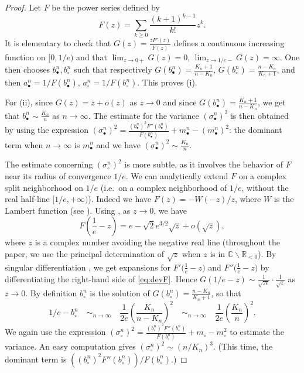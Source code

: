 \documentclass[11pt]{article}
\theoremstyle{definition}
\numberwithin{equation}{section}
\numberwithin{figure}{section}
\numberwithin{table}{section}
\newcommand{\R}{\mathbb{R}}
\newcommand{\CC}{\mathbb{C}}
\def\abn{a_{\bullet}^{n}}
\def\acn{a_{\circ}^{n}}
\def\bbn{b_{\bullet}^{n}}
\def\bcn{b_{\circ}^{n}}
\def\mbn{m_{\bullet}^{n}}
\def\scn{\sigma_{\circ}^{n}}
\def\sbn{\sigma_{\bullet}^{n}}
\begin{document}
\begin{proof}Let $F$ be the power series defined by
\begin{equation}
\label{eq:F}F(z)= \sum_{k \geq 0} \frac{(k+1)^{k-1}}{k!} z^{k}.
\end{equation}
It is elementary to check that $G(z)= \frac{z F'(z)}{F(z)}$ defines a continuous increasing function on $[0,1/e)$ and that $\lim_{z \rightarrow 0+} G(z)=0$, $\lim_{z \rightarrow 1/e-} G(z)=\infty$. One then chooses $\bbn, \bcn$ such that respectively $G(\bbn)=\frac{K_{n}+1}{n-K_{n}}$, $G(\bcn)= \frac{n-K_{n}}{K_{n}+1}$, and then $\abn=1/F(\bbn)$, $\acn=1/F(\bcn)$.
This proves (i).

For (ii), since $G(z)=z+o(z)$ as $z \rightarrow 0$ and since $G(\bbn)= \frac{K_{n}+1}{n-K_{n}}$, we get that $\bbn \sim \frac{K_{n}}{n}$ as $n \rightarrow \infty$.
The estimate for the variance $(\sbn)^{2}$ is then obtained by using the expression
\hbox{$(\sbn)^{2}= \frac{(\bbn)^{2} F''(\bbn)}{F(\bbn)}+\mbn-(\mbn)^{2}$:}
the dominant term when $n  \rightarrow \infty$ is $\mbn$
and we have \hbox{$(\sbn)^{2}\sim \frac{K_{n}}{n}$}.


The estimate concerning $(\scn)^{2}$ is more subtle, as it involves the behavior of $F$ near its radius of convergence $1/e$.
We can analytically extend $F$
on a complex split neighborhood on $1/e$ (i.e.\ on a complex neighborhood of $1/e$, without the real half-line $[1/e,+\infty)$).
Indeed we have $F(z)=-W(-z)/z$, where $W$ is the Lambert function (see \cite[Eq~3.1]{CGHJK96}).
Using \cite[Eq~4.22]{CGHJK96}, as $z \rightarrow 0$, we have
\begin{equation}
\label{eq:devF}F \left( \frac{1}{e}-z \right)=e- \sqrt{2} e^{3/2} \sqrt{z}+ o(\sqrt{z}),
\end{equation}
where $z$ is a complex number avoiding the negative real line
(throughout the paper, we use the principal determination of
$\sqrt{z}$ when $z$ is in $\CC \backslash \R_{<0}$).
By singular differentiation \cite[Theorem VI.8 p. 419]{FS09},
we get expansions for $F' \big( \tfrac{1}{e}-z \big)$ and $F'' \big( \tfrac{1}{e}-z \big)$
by differentiating the right-hand side of \eqref{eq:devF}.
Hence $G(1/e-z) \sim \frac{1}{\sqrt{2e}} \cdot \frac{1}{\sqrt{z}}$ as $z \rightarrow 0$.
By definition $\bcn$ is the solution of $G(\bcn)=\tfrac{n-K_n}{K_n+1}$, so that
\begin{equation}
  1/e-\bcn  \quad \mathop{\sim}_{n \rightarrow \infty} \quad  \frac{1}{2e} \left( \frac{K_n}{n-K_n}  \right)^{2}  \quad \mathop{\sim}_{n \rightarrow \infty} \quad  \frac{1}{2e} \left( \frac{K_n}{n}  \right)^{2}.
  \label{eq:est_bcirc}
\end{equation}
We again use the expression \hbox{$(\scn)^{2}= \frac{(\bcn)^{2} F''(\bcn)}{F(\bcn)}+m_{\circ}-m_{\circ}^{2}$}
to estimate the variance.
An easy computation gives $(\scn)^{2}\sim ( {n}/{K_{n}} )^{3}$.
(This time, the dominant term is $\left({(\bcn)^{2} F''(\bcn)}\right)\big/{F(\bcn)}$.)
\end{proof}
\end{document}
